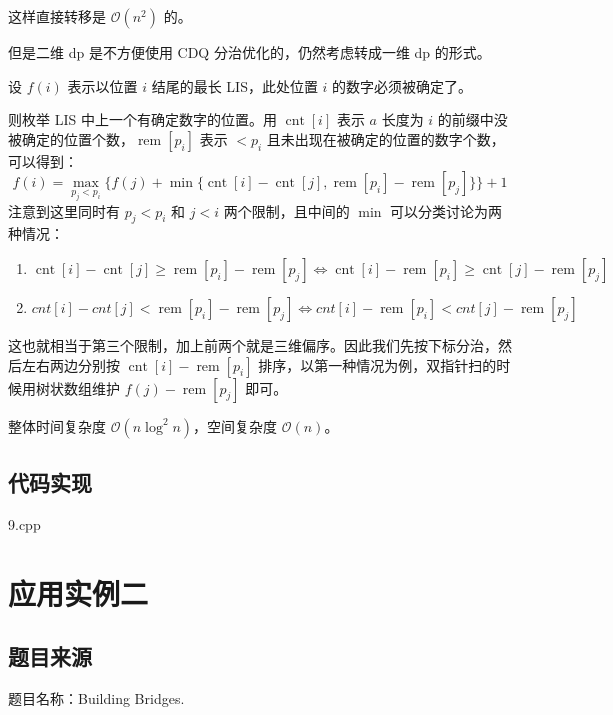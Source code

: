 这样直接转移是 \(\mathcal{O}(n^2)\) 的。

但是二维 dp 是不方便使用 CDQ 分治优化的，仍然考虑转成一维 dp 的形式。

设 \(f(i)\) 表示以位置 \(i\) 结尾的最长 LIS，此处位置 \(i\)
的数字必须被确定了。

则枚举 LIS 中上一个有确定数字的位置。用 \(\operatorname{cnt}[i]\) 表示
\(a\) 长度为 \(i\)
的前缀中没被确定的位置个数，\(\operatorname{rem}[p_i]\) 表示 \(< p_i\)
且未出现在被确定的位置的数字个数，可以得到： \[
f(i)=\max_{p_j < p_i}\{f(j)+\min\{\operatorname{cnt}[i]-\operatorname{cnt}[j],\operatorname{rem}[p_i]-\operatorname{rem}[p_j]\}\}+1
\] 注意到这里同时有 \(p_j<p_i\) 和 \(j<i\) 两个限制，且中间的 \(\min\)
可以分类讨论为两种情况：

\begin{enumerate}
\def\labelenumi{\arabic{enumi}.}

\item
  \(\operatorname{cnt}[i]-\operatorname{cnt}[j]\geq\operatorname{rem}[p_i]-\operatorname{rem}[p_j] \iff \operatorname{cnt}[i]-\operatorname{rem}[p_i]\geq\operatorname{cnt}[j]-\operatorname{rem}[p_j]\)
\item
  \(cnt[i]-cnt[j]<\operatorname{rem}[p_i]-\operatorname{rem}[p_j] \iff cnt[i]-\operatorname{rem}[p_i]<cnt[j]-\operatorname{rem}[p_j]\)
\end{enumerate}

这也就相当于第三个限制，加上前两个就是三维偏序。因此我们先按下标分治，然后左右两边分别按
\(\operatorname{cnt}[i]-\operatorname{rem}[p_i]\)
排序，以第一种情况为例，双指针扫的时候用树状数组维护
\(f(j)-\operatorname{rem}[p_j]\) 即可。

整体时间复杂度 \(\mathcal{O}(n \log^2 n)\)，空间复杂度
\(\mathcal{O}(n)\)。

\subsection{代码实现}

9.cpp

\section{应用实例二}

\subsection{题目来源}

题目名称：Building Bridges.

